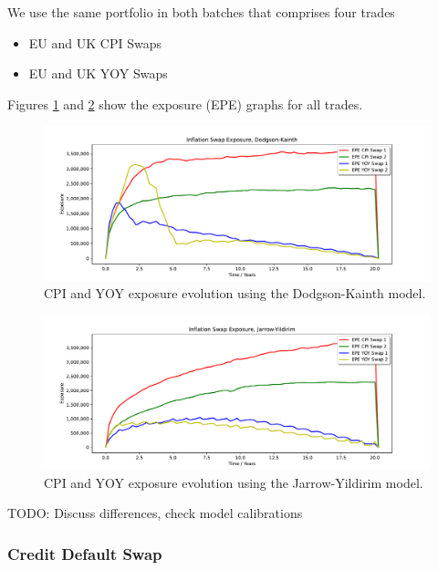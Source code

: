 We use the same portfolio in both batches that comprises four trades
\begin{itemize}
\item EU and UK CPI Swaps
\item EU and UK YOY Swaps
\end{itemize}

Figures \ref{fig_inflation_dk} and \ref{fig_inflation_jy} show the exposure (EPE) graphs for all trades.

\begin{figure}[h!]
  \begin{center}
    \includegraphics[scale=0.45]{examples/mpl_exposure_inflation_dk.pdf}
  \end{center}
  \caption{CPI and YOY exposure evolution using the Dodgson-Kainth model.}
  \label{fig_inflation_dk}
\end{figure}

\begin{figure}[h!]
  \begin{center}
    \includegraphics[scale=0.45]{examples/mpl_exposure_inflation_jy.pdf}
  \end{center}
  \caption{CPI and YOY exposure evolution using the Jarrow-Yildirim model.}
  \label{fig_inflation_jy}
\end{figure}

TODO: Discuss differences, check model calibrations

\subsubsection{Credit Default Swap}\label{example:exposure_credit}


